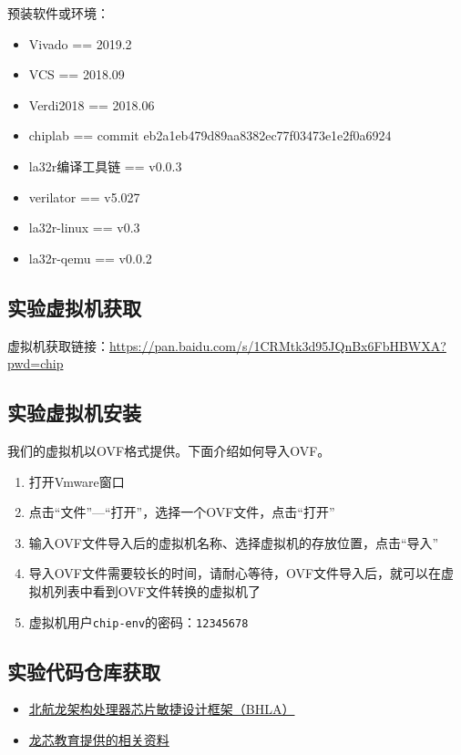 预装软件或环境：

\begin{itemize}
\tightlist
\item
  Vivado == 2019.2
\item
  VCS == 2018.09
\item
  Verdi2018 == 2018.06
\item
  chiplab == commit eb2a1eb479d89aa8382ec77f03473e1e2f0a6924
\item
  la32r编译工具链 == v0.0.3
\item
  verilator == v5.027
\item
  la32r-linux == v0.3
\item
  la32r-qemu == v0.0.2
\end{itemize}

\subsection{实验虚拟机获取}\label{sec:02-design-environment-011}

虚拟机获取链接：\url{https://pan.baidu.com/s/1CRMtk3d95JQnBx6FbHBWXA?pwd=chip}

\subsection{实验虚拟机安装}\label{sec:02-design-environment-012}

我们的虚拟机以OVF格式提供。下面介绍如何导入OVF。

\begin{enumerate}
\def\labelenumi{\arabic{enumi}.}
\tightlist
\item
  打开Vmware窗口
\item
  点击``文件''---``打开''，选择一个OVF文件，点击``打开''
\item
  输入OVF文件导入后的虚拟机名称、选择虚拟机的存放位置，点击``导入''
\item
  导入OVF文件需要较长的时间，请耐心等待，OVF文件导入后，就可以在虚拟机列表中看到OVF文件转换的虚拟机了
\item
  虚拟机用户\texttt{chip-env}的密码：\texttt{12345678}
\end{enumerate}

\subsection{实验代码仓库获取}\label{sec:02-design-environment-013}

\begin{itemize}
\tightlist
\item
  \href{https://github.com/BUAA-CI-LAB/BHLA.README}{北航龙架构处理器芯片敏捷设计框架（BHLA）}
\item
  \href{https://gitee.com/loongson-edu}{龙芯教育提供的相关资料}
\end{itemize}
